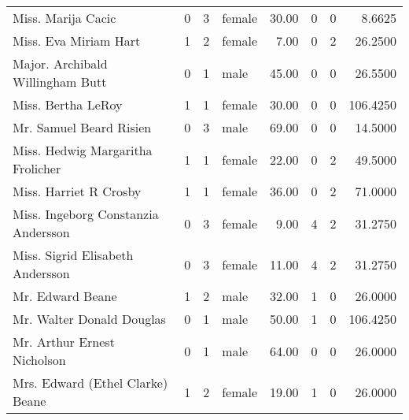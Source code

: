 \begin{tabular}{lrrlrrrr}
Miss. Marija Cacic                                 &         0 &       3 &  female &  30.00 &                        0 &                        0 &    8.6625 \\
Miss. Eva Miriam Hart                              &         1 &       2 &  female &   7.00 &                        0 &                        2 &   26.2500 \\
Major. Archibald Willingham Butt                   &         0 &       1 &    male &  45.00 &                        0 &                        0 &   26.5500 \\
Miss. Bertha LeRoy                                 &         1 &       1 &  female &  30.00 &                        0 &                        0 &  106.4250 \\
Mr. Samuel Beard Risien                            &         0 &       3 &    male &  69.00 &                        0 &                        0 &   14.5000 \\
Miss. Hedwig Margaritha Frolicher                  &         1 &       1 &  female &  22.00 &                        0 &                        2 &   49.5000 \\
Miss. Harriet R Crosby                             &         1 &       1 &  female &  36.00 &                        0 &                        2 &   71.0000 \\
Miss. Ingeborg Constanzia Andersson                &         0 &       3 &  female &   9.00 &                        4 &                        2 &   31.2750 \\
Miss. Sigrid Elisabeth Andersson                   &         0 &       3 &  female &  11.00 &                        4 &                        2 &   31.2750 \\
Mr. Edward Beane                                   &         1 &       2 &    male &  32.00 &                        1 &                        0 &   26.0000 \\
Mr. Walter Donald Douglas                          &         0 &       1 &    male &  50.00 &                        1 &                        0 &  106.4250 \\
Mr. Arthur Ernest Nicholson                        &         0 &       1 &    male &  64.00 &                        0 &                        0 &   26.0000 \\
Mrs. Edward (Ethel Clarke) Beane                   &         1 &       2 &  female &  19.00 &                        1 &                        0 &   26.0000 \\

\end{tabular}

